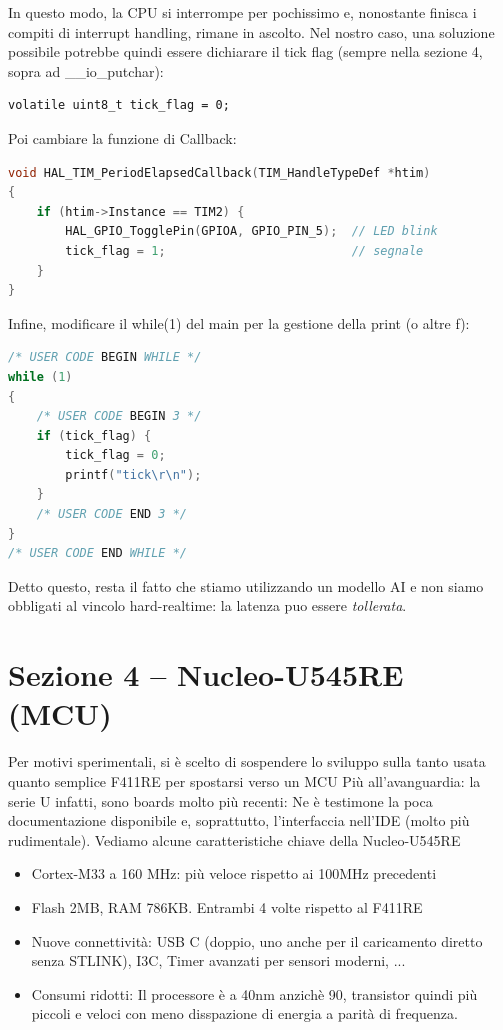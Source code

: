 In questo modo, la CPU si interrompe per pochissimo e, nonostante finisca i compiti di interrupt handling, rimane in ascolto.
Nel nostro caso, una soluzione possibile potrebbe quindi essere dichiarare il tick flag (sempre nella sezione 4, sopra ad \_\_io\_putchar):

\begin{verbatim}
volatile uint8_t tick_flag = 0;
\end{verbatim}

Poi cambiare la funzione di Callback:

\begin{lstlisting}[language=C]
void HAL_TIM_PeriodElapsedCallback(TIM_HandleTypeDef *htim)
{
    if (htim->Instance == TIM2) {
        HAL_GPIO_TogglePin(GPIOA, GPIO_PIN_5);  // LED blink
        tick_flag = 1;                          // segnale
    }
}
\end{lstlisting}

Infine, modificare il while(1) del main per la gestione della print (o altre f):

\begin{lstlisting}[language=C]
/* USER CODE BEGIN WHILE */
while (1)
{
    /* USER CODE BEGIN 3 */
    if (tick_flag) {
        tick_flag = 0;
        printf("tick\r\n");
    }
    /* USER CODE END 3 */
}
/* USER CODE END WHILE */
\end{lstlisting}

Detto questo, resta il fatto che stiamo utilizzando un modello AI e non siamo obbligati al vincolo hard-realtime: la latenza puo essere \textit{tollerata}.

\section{Sezione 4 -- Nucleo-U545RE (MCU)}

Per motivi sperimentali, si è scelto di sospendere lo sviluppo sulla tanto usata quanto semplice F411RE per spostarsi verso un MCU Più all'avanguardia: la serie U infatti, sono boards molto più recenti: Ne è testimone la poca documentazione disponibile e, soprattutto, l'interfaccia nell'IDE (molto più rudimentale). Vediamo alcune caratteristiche chiave della
Nucleo-U545RE
\begin{itemize}
    \item Cortex-M33 a 160 MHz: più veloce rispetto ai 100MHz precedenti
    \item Flash 2MB, RAM 786KB. Entrambi 4 volte rispetto al F411RE
    \item Nuove connettività: USB C (doppio, uno anche per il caricamento diretto senza STLINK), I3C, Timer avanzati per sensori moderni, ...
    \item Consumi ridotti: Il processore è a 40nm anzichè 90, transistor quindi più piccoli e veloci con meno disspazione di energia a parità di frequenza.
\end{itemize}


